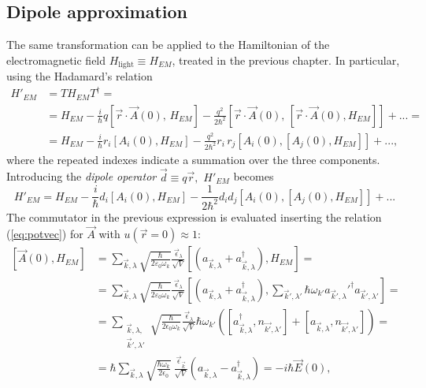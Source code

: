 \subsection{Dipole approximation}
\label{dipole}

The same transformation can be applied to the Hamiltonian of the electromagnetic field $H_\text{light} \equiv H_{EM}$, treated in the previous chapter. In particular, using the Hadamard's relation 
\begin{align*}
    H'_{EM} &= T H_{EM} T^\dagger = \\
    &= H_{EM} - \frac{i}{\hbar} q \left[\vec{r} \cdot \vec{A}(0), \, H_{EM} \right] - \frac{q^2}{2\hbar^2} \left[ \vec{r} \cdot \vec{A}(0), \, \left[  \vec{r} \cdot \vec{A}(0), H_{EM} \right]\right] + ... = \\ 
    &= H_{EM} - \frac{i}{\hbar} {r_i} \left[ {A_i}(0), H_{EM}\right] - \frac{q^2}{2\hbar^2} r_i \, r_j \left[ A_i(0), \left[ A_j(0), H_{EM} \right] \right] + ..., 
\end{align*}
where the repeated indexes indicate a summation over the three components. Introducing the \textit{dipole operator} $\Vec{d}\equiv q\Vec{r},$ $H'_{EM}$ becomes 
\begin{equation}
    H'_{EM} = H_{EM} - \frac{i}{\hbar} d_i [A_i(0), H_{EM}]- \frac{1}{2\hbar^2} d_i d_j [A_i(0),[A_j(0), H_{EM}]]+ ...
    \label{eq:Hem1}
\end{equation}
The commutator in the previous expression is evaluated inserting the relation (\ref{eq:potvec}) for $\Vec{A}$ with $u(\Vec{r} = 0) \approx 1$:
\begin{align*}
    \left[\Vec{A}(0), H_{EM} \right] &= \sum_{\vec{k},\lambda} \sqrt{\frac{\hbar}{2 \varepsilon_0 \omega_k}} \frac{\vec{\epsilon}_\lambda}{\sqrt{V}} \left[ \left(a_{\vec{k},\lambda} + a_{\vec{k},\lambda}^\dagger\right), H_{EM}\right] = \\
    &= \sum_{\vec{k},\lambda} \sqrt{\frac{\hbar}{2 \varepsilon_0 \omega_k}} \frac{\vec{\epsilon}_\lambda}{\sqrt{V}} \left[ \left(a_{\vec{k},\lambda} + a_{\vec{k},\lambda}^\dagger\right), \sum_{\vec{k}',\lambda'} \hbar \omega_{k'} a_{\vec{k}',\lambda}'^\dagger a_{\vec{k}',\lambda'} \right] = \\
    &= \sum\limits_{\substack{\Vec{k},\lambda, \\ \Vec{k}', \lambda'}}
    \sqrt{\frac{\hbar}{2\epsilon_0\omega_k}} \frac{\Vec{\epsilon}_\lambda}{\sqrt{V}} \hbar\omega_{k'} \left(\left[a_{\Vec{k},\lambda}^\dagger, n_{\Vec{k'},\lambda'}\right]+\left[a_{\Vec{k},\lambda}, n_{\Vec{k'},\lambda'}\right]\right)=\\
    &=\hbar \sum_{\Vec{k}, \lambda} \sqrt{\frac{\hbar\omega_k}{2\epsilon_0}}~ \frac{\Vec{\epsilon}_{\Vec{k}}}{\sqrt{V}} \left(a_{\Vec{k},\lambda}-a_{\Vec{k},\lambda}^\dagger\right)= -i\hbar \Vec{E}(0),
\end{align*}
